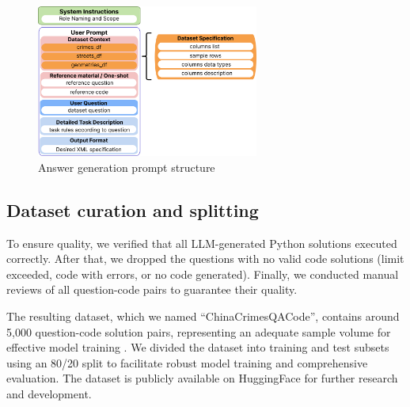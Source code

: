 \begin{figure}[H]
  \centering
  \includegraphics[width=0.65\textwidth]{images/answer_gen.png}
  \caption{Answer generation prompt structure}
  \label{fig:answer_generation_prompt_structure}
\end{figure}


\subsection{Dataset curation and splitting}

To ensure quality, we verified that all LLM-generated Python solutions executed correctly. After that, we dropped the questions with no valid code solutions (limit exceeded, code with errors, or no code generated). Finally, we conducted manual reviews of all question-code pairs to guarantee their quality.

The resulting dataset, which we named ``ChinaCrimesQACode'', contains around 5,000 question-code solution pairs, representing an adequate sample volume for effective model training \citep{Unsloth2024Dataset1}. We divided the dataset into training and test subsets using an 80/20 split to facilitate robust model training and comprehensive evaluation. The dataset is publicly available on HuggingFace for further research and development.  %



